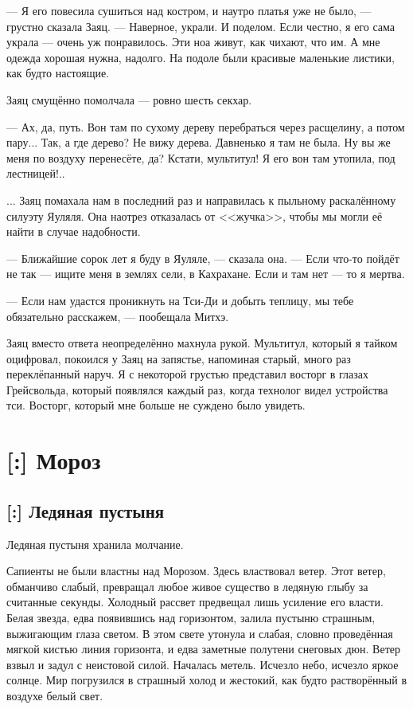 --- Я его повесила сушиться над костром, и наутро платья уже не было, --- грустно сказала Заяц.
--- Наверное, украли.
И поделом.
Если честно, я его сама украла --- очень уж понравилось.
Эти ноа живут, как чихают, что им.
А мне одежда хорошая нужна, надолго.
На подоле были красивые маленькие листики, как будто настоящие.

Заяц смущённо помолчала --- ровно шесть секхар.

--- Ах, да, путь.
Вон там по сухому дереву перебраться через расщелину, а потом пару...
Так, а где дерево?
Не вижу дерева.
Давненько я там не была.
Ну вы же меня по воздуху перенесёте, да?
Кстати, мультитул!
Я его вон там утопила, под лестницей!..

... Заяц помахала нам в последний раз и направилась к пыльному раскалённому силуэту Яуляля.
Она наотрез отказалась от <<жучка>>, чтобы мы могли её найти в случае надобности.

--- Ближайшие сорок лет я буду в Яуляле, --- сказала она.
--- Если что-то пойдёт не так --- ищите меня в землях сели, в Кахрахане.
Если и там нет --- то я мертва.

--- Если нам удастся проникнуть на Тси-Ди и добыть теплицу, мы тебе обязательно расскажем, --- пообещала Митхэ.

Заяц вместо ответа неопределённо махнула рукой.
Мультитул, который я тайком оцифровал, покоился у Заяц на запястье, напоминая старый, много раз переклёпанный наруч.
Я с некоторой грустью представил восторг в глазах Грейсвольда, который появлялся каждый раз, когда технолог видел устройства тси.
Восторг, который мне больше не суждено было увидеть.

\chapter{[:] Мороз}

\section{[:] Ледяная пустыня}

Ледяная пустыня хранила молчание.

Сапиенты не были властны над Морозом.
Здесь властвовал ветер.
Этот ветер, обманчиво слабый, превращал любое живое существо в ледяную глыбу за считанные секунды.
Холодный рассвет предвещал лишь усиление его власти.
Белая звезда, едва появившись над горизонтом, залила пустыню страшным, выжигающим глаза светом.
В этом свете утонула и слабая, словно проведённая мягкой кистью линия горизонта, и едва заметные полутени снеговых дюн.
Ветер взвыл и задул с неистовой силой.
Началась метель.
Исчезло небо, исчезло яркое солнце.
Мир погрузился в страшный холод и жестокий, как будто растворённый в воздухе белый свет.

